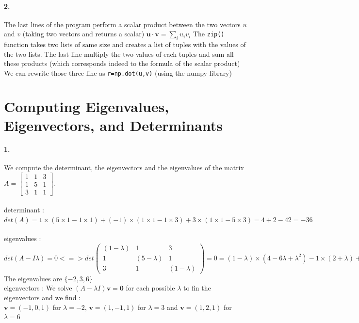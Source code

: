 \documentclass[14pt]
{article}
\begin{document}
\paragraph*{2.} The last lines of the program perform a scalar product between the two vectors $u$ and $v$ (taking two vectors and returns a scalar) $\mathbf{u}\cdot \mathbf{v}=\displaystyle\sum_{i} u_{i}v_{i}$ The \texttt{zip()} function takes two lists of same size and creates a list of tuples with the values of the two lists. The last line multiply the two values of each tuples and sum all these products (which corresponds indeed to the formula of the scalar product)\\
We can rewrite those three line as \texttt{r=np.dot(u,v)} (using the numpy library)\\


\section{Computing Eigenvalues, Eigenvectors, and Determinants} %
\bigskip
\paragraph*{1.}We compute the determinant, the eigenvectors and the eigenvalues of the matrix $A=\begin{bmatrix}
1 & 1 & 3 \\ 
1 & 5 & 1 \\ 
3 & 1 & 1
\end{bmatrix} $. \\
\\
determinant : $det(A)=1\times(5\times1-1\times1)+(-1)\times(1\times1-1\times3)+3\times(1\times1-5\times3) =4+2-42=-36$ \\
\\
eigenvalues : $det(A - I\lambda)= 0 <=> det\left( \begin{matrix} (1 - \lambda) & 1 & 3 \\ 1 & (5 - \lambda) & 1 \\ 3 & 1 & (1 - \lambda) \end{matrix} \right) = 0= (1 - \lambda) \times (4 - 6\lambda + \lambda^{2}) - 1 \times (2 + \lambda) + 3 \times (1 - 15 + 3\lambda) = -36 + 7\lambda^{2} - \lambda^{3} = -(\lambda + 2)(\lambda - 3)(\lambda - 6)$\\
The eigenvalues are $\{-2, 3, 6\}$\\
eigenvectors : We solve $(A-\lambda I)\mathbf{v}=\mathbf{0}$ for each possible $\lambda$ to fin the eigenvectors and we find :\\
$\mathbf{v}=(-1,0,1)$ for $\lambda =-2$, $\mathbf{v}=(1,-1,1)$ for $\lambda =3$ and $\mathbf{v}=(1,2,1)$ for $\lambda =6$
\end{document}
